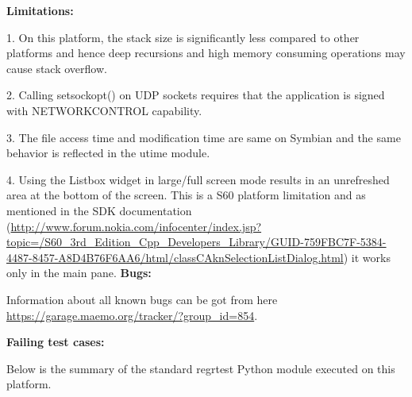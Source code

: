 %
%
%

\label{known-issues}

{\bf Limitations:}

1. On this platform, the stack size is significantly less compared to other platforms and 
hence deep recursions and high memory consuming operations may cause stack overflow.

2. Calling setsockopt() on UDP sockets requires that the application is signed with NETWORKCONTROL capability.

3. The file access time and modification time are same on Symbian and the same behavior is reflected in the utime module.

4. Using the Listbox widget in large/full screen mode results in an unrefreshed area at the bottom of the screen. This is 
a S60 platform limitation and as mentioned in the SDK documentation (\url{http://www.forum.nokia.com/infocenter/index.jsp?topic=/S60_3rd_Edition_Cpp_Developers_Library/GUID-759FBC7F-5384-4487-8457-A8D4B76F6AA6/html/classCAknSelectionListDialog.html})
 it works only in the main pane.
\break
{\bf Bugs:}

Information about all known bugs can be got from here \url{https://garage.maemo.org/tracker/?group_id=854}.

\break
{\bf Failing test cases:}

Below is the summary of the standard regrtest Python module executed on this platform.

